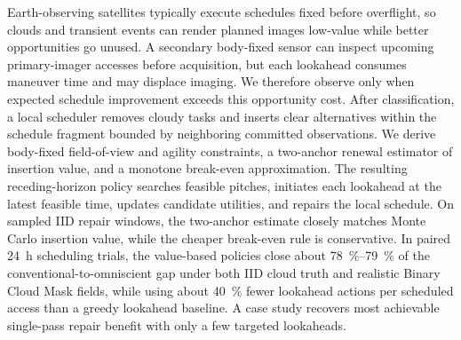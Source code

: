 Earth-observing satellites typically execute schedules fixed before overflight, so clouds and transient events can render planned images low-value while better opportunities go unused.
A secondary body-fixed sensor can inspect upcoming primary-imager accesses before acquisition, but each lookahead consumes maneuver time and may displace imaging.
We therefore observe only when expected schedule improvement exceeds this opportunity cost.
After classification, a local scheduler removes cloudy tasks and inserts clear alternatives within the schedule fragment bounded by neighboring committed observations.
We derive body-fixed field-of-view and agility constraints, a two-anchor renewal estimator of insertion value, and a monotone break-even approximation.
The resulting receding-horizon policy searches feasible pitches, initiates each lookahead at the latest feasible time, updates candidate utilities, and repairs the local schedule.
On sampled IID repair windows, the two-anchor estimate closely matches Monte Carlo insertion value, while the cheaper break-even rule is conservative.
In paired \SI{24}{\hour} scheduling trials, the value-based policies close about \SI{78}{\percent}--\SI{79}{\percent} of the conventional-to-omniscient gap under both IID cloud truth and realistic Binary Cloud Mask fields, while using about \SI{40}{\percent} fewer lookahead actions per scheduled access than a greedy lookahead baseline.
A case study recovers most achievable single-pass repair benefit with only a few targeted lookaheads.
